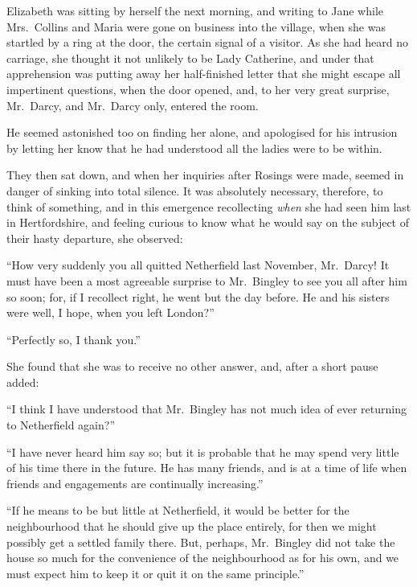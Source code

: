 \documentclass[12pt,english,oneside]{book}
\begin{document}

Elizabeth was sitting by herself the next morning, and writing to
Jane while Mrs.\ Collins and Maria were gone on business into the
village, when she was startled by a ring at the door, the certain
signal of a visitor. As she had heard no carriage, she thought it
not unlikely to be Lady Catherine, and under that apprehension was
putting away her half-finished letter that she might escape all impertinent
questions, when the door opened, and, to her very great surprise,
Mr.\ Darcy, and Mr.\ Darcy only, entered the room.

He seemed astonished too on finding her alone, and apologised for
his intrusion by letting her know that he had understood all the ladies
were to be within.

They then sat down, and when her inquiries after Rosings were made,
seemed in danger of sinking into total silence. It was absolutely
necessary, therefore, to think of something, and in this emergence
recollecting \textit{when} she had seen him last in Hertfordshire,
and feeling curious to know what he would say on the subject of their
hasty departure, she observed:

{}``How very suddenly you all quitted Netherfield last November,
Mr.\ Darcy! It must have been a most agreeable surprise to Mr.\ Bingley
to see you all after him so soon; for, if I recollect right, he went
but the day before. He and his sisters were well, I hope, when you
left London?''\ 

{}``Perfectly so, I thank you.''

She found that she was to receive no other answer, and, after a short
pause added:

{}``I think I have understood that Mr.\ Bingley has not much idea
of ever returning to Netherfield again?''\ 

{}``I have never heard him say so; but it is probable that he may
spend very little of his time there in the future. He has many friends,
and is at a time of life when friends and engagements are continually
increasing.''

{}``If he means to be but little at Netherfield, it would be better
for the neighbourhood that he should give up the place entirely, for
then we might possibly get a settled family there. But, perhaps, Mr.\ Bingley
did not take the house so much for the convenience of the neighbourhood
as for his own, and we must expect him to keep it or quit it on the
same principle.''
\end{document}
